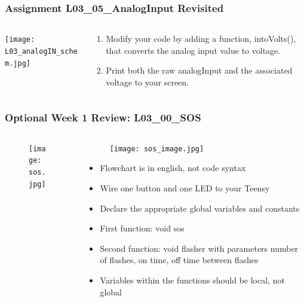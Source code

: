 \documentclass{beamer}
\begin{document}
\begin{frame}\frametitle{Assignment L03\_05\_AnalogInput Revisited}
\begin{columns}
\begin{column}{4cm}
\begin{overprint}
\texttt{[image: L03\_analogIN\_schem.jpg]}
\end{overprint}
\end{column}
\begin{column}{6cm}
\begin{enumerate}
\item Modify your code by adding a function, intoVolts(), that converts the analog input value to voltage.
\item Print both the raw analogInput and the associated voltage to your screen. 
\end{enumerate}
\end{column}
\end{columns}
\end{frame}

\begin{frame}\frametitle{Optional Week 1 Review: L03\_00\_SOS}
\begin{columns}
\begin{column}{8cm}
\begin{figure}[h]
	\texttt{[image: sos.jpg]}
\end{figure}
\end{column}
\begin{column}{4cm}
\begin{figure}[h]
	\texttt{[image: sos\_image.jpg]}
\end{figure}
\begin{tiny}
\begin{itemize}
\item Flowchart is in english, not code syntax
\item Wire one button and one LED to your Teensy
\item Declare the appropriate global variables and constants
\item First function: void sos
\item Second function: void flasher with parameters number of flashes, on time, off time between flashes
\item Variables within the functions should be local, not global
\end{itemize}
\end{tiny}
\end{column}
\end{columns}
\end{frame}
\end{document}
